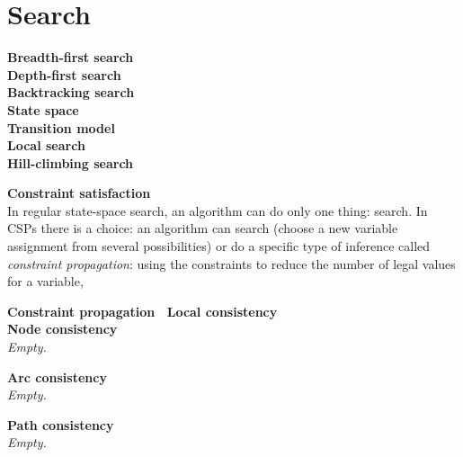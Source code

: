 \section{Search}


\textbf{Breadth-first search\index{}} \\

\textbf{Depth-first search\index{}} \\

\textbf{Backtracking search\index{}} \\

\textbf{State space\index{}} \\

\textbf{Transition model\index{}} \\

\textbf{Local search\index{}} \\

\textbf{Hill-climbing search\index{}}

\textbf{Constraint satisfaction\index{}} \\
In regular state-space search, an algorithm can do only one thing: search. In CSPs there is a choice: an algorithm can search (choose a new variable assignment from several possibilities) or do a specific type of inference  called \textit{constraint propagation}: using the constraints to reduce the number of legal values for a variable,

\textbf{Constraint propagation \ Local consistency\index{}} \\

\textbf{Node consistency\index{}} \\
\textit{Empty.}

\textbf{Arc consistency\index{}} \\
\textit{Empty.}

\textbf{Path consistency\index{}} \\
\textit{Empty.}